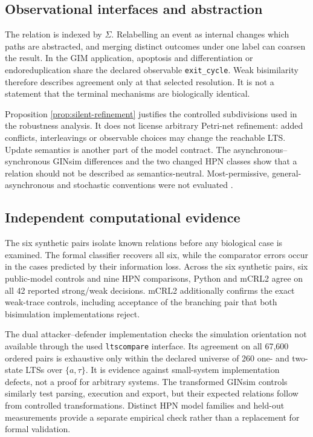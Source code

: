 \documentclass[JMCS,submit]{resources/ISRP}
\theoremstyle{definition}
\theoremstyle{remark}
\numberwithin{equation}{section}
\newcommand{\TAU}{\tau}
\begin{document}
\subsection{Observational interfaces and abstraction}
\label{sec:discussion-interface}

The relation is indexed by $\Sigma$. Relabelling an event as internal changes
which paths are abstracted, and merging distinct outcomes under one label can
coarsen the result. In the GIM application, apoptosis and
differentiation or endoreduplication share the declared observable
\texttt{exit\_cycle}. Weak bisimilarity therefore describes agreement only at
that selected resolution. It is not a statement that the terminal mechanisms are
biologically identical.

Proposition \ref{prop:silent-refinement} justifies the controlled subdivisions
used in the robustness analysis. It does not license arbitrary Petri-net
refinement: added conflicts, interleavings or observable choices may change the
reachable LTS. Update semantics is another part of the model contract. The
asynchronous--synchronous GINsim differences and the two changed HPN classes show
that a relation should not be described as semantics-neutral. Most-permissive,
general-asynchronous and stochastic conventions were not evaluated
\cite{Pauleve2020}.

\subsection{Independent computational evidence}
\label{sec:discussion-validation}

The six synthetic pairs isolate known relations before any biological case is
examined. The formal classifier recovers all six, while the comparator errors
occur in the cases predicted by their information loss. Across the six synthetic
pairs, six public-model controls and nine HPN comparisons, Python and mCRL2 agree
on all 42 reported strong/weak decisions. mCRL2 additionally confirms the exact
weak-trace controls, including acceptance of the branching pair that both
bisimulation implementations reject.

The dual attacker--defender implementation checks the simulation orientation not
available through the used \texttt{ltscompare} interface. Its agreement on all
67,600 ordered pairs is exhaustive only within the declared universe of 260
one- and two-state LTSs over $\{a,\TAU\}$. It is evidence against small-system
implementation defects, not a proof for arbitrary systems. The transformed
GINsim controls similarly test parsing, execution and export, but their expected
relations follow from controlled transformations. Distinct HPN model families
and held-out measurements provide a separate empirical check rather than a
replacement for formal validation.
\end{document}
